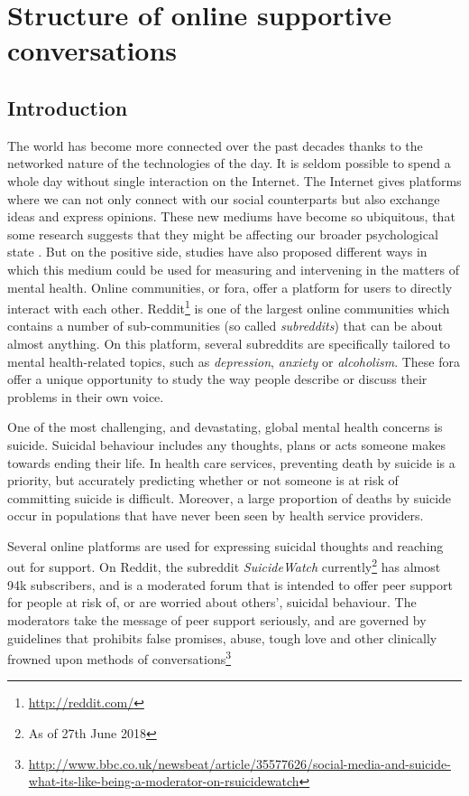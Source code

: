 \chapter{Structure of online supportive conversations}
\label{chap:structure_support}


\graphicspath{{Chapter4/plots/}}

\section{Introduction}

The world has become more connected over the past decades thanks to the networked nature of the technologies of the day. It is seldom possible to spend a whole day without single interaction on the Internet. The Internet gives platforms where we can not only connect with our social counterparts but also exchange ideas and express opinions. These new mediums have become so ubiquitous, that some research suggests that they might be affecting our broader psychological state \cite{d20122}. But on the positive side, studies have also proposed different ways in which this medium could be used for measuring and intervening in the matters of mental health\cite{DeChoudhury2016,DeChoudhury2014}.
Online communities, or fora, offer a platform for users to directly interact with each other. Reddit\footnote{\url{http://reddit.com/}} is one of the largest online communities which contains a number of sub-communities (so called \emph{subreddits}) that can be about almost anything. On this platform, several subreddits are specifically tailored to mental health-related topics, such as \emph{depression}, \emph{anxiety} or \emph{alcoholism}. These fora offer a unique opportunity to study the way people describe or discuss their problems in their own voice.

One of the most challenging, and devastating, global mental health concerns is suicide. Suicidal behaviour includes any thoughts, plans or acts someone makes towards ending their life. In health care services, preventing death by suicide is a priority, but accurately predicting whether or not someone is at risk of committing suicide is difficult. Moreover, a large proportion of deaths by suicide occur in populations that have never been seen by health service providers.

Several online platforms are used for expressing suicidal thoughts and reaching out for support. On Reddit, the subreddit \emph{SuicideWatch} currently\footnote{As of 27th June 2018} has almost 94k subscribers, and is a moderated forum that is intended to offer peer support for people at risk of, or are worried about others', suicidal behaviour. The moderators take the message of peer support seriously, and are governed by guidelines that prohibits false promises, abuse, tough love and other clinically frowned upon methods of conversations\footnote{\url{http://www.bbc.co.uk/newsbeat/article/35577626/social-media-and-suicide-what-its-like-being-a-moderator-on-rsuicidewatch} }

